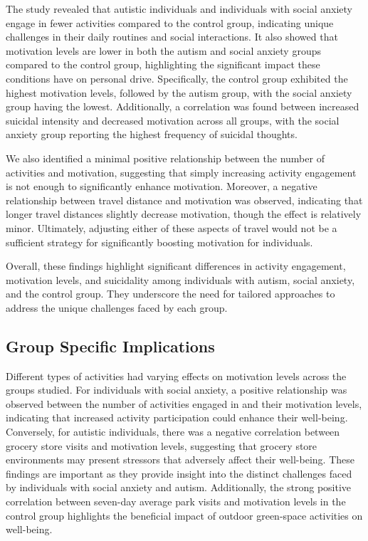 \documentclass[
  letterpaper,
  number,
  review,
  3p]{elsarticle}
\begin{document}
The study revealed that autistic individuals and individuals with social
anxiety engage in fewer activities compared to the control group,
indicating unique challenges in their daily routines and social
interactions. It also showed that motivation levels are lower in both
the autism and social anxiety groups compared to the control group,
highlighting the significant impact these conditions have on personal
drive. Specifically, the control group exhibited the highest motivation
levels, followed by the autism group, with the social anxiety group
having the lowest. Additionally, a correlation was found between
increased suicidal intensity and decreased motivation across all groups,
with the social anxiety group reporting the highest frequency of
suicidal thoughts.

We also identified a minimal positive relationship between the number of
activities and motivation, suggesting that simply increasing activity
engagement is not enough to significantly enhance motivation. Moreover,
a negative relationship between travel distance and motivation was
observed, indicating that longer travel distances slightly decrease
motivation, though the effect is relatively minor. Ultimately, adjusting
either of these aspects of travel would not be a sufficient strategy for
significantly boosting motivation for individuals.

Overall, these findings highlight significant differences in activity
engagement, motivation levels, and suicidality among individuals with
autism, social anxiety, and the control group. They underscore the need
for tailored approaches to address the unique challenges faced by each
group.

\subsection{Group Specific
Implications}\label{group-specific-implications}

Different types of activities had varying effects on motivation levels
across the groups studied. For individuals with social anxiety, a
positive relationship was observed between the number of activities
engaged in and their motivation levels, indicating that increased
activity participation could enhance their well-being. Conversely, for
autistic individuals, there was a negative correlation between grocery
store visits and motivation levels, suggesting that grocery store
environments may present stressors that adversely affect their
well-being. These findings are important as they provide insight into
the distinct challenges faced by individuals with social anxiety and
autism. Additionally, the strong positive correlation between seven-day
average park visits and motivation levels in the control group
highlights the beneficial impact of outdoor green-space activities on
well-being.
\end{document}
